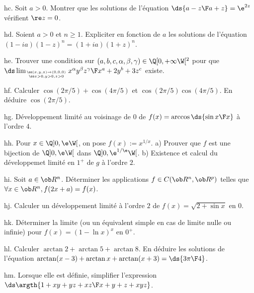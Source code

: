 \exo [Level=1,Fight=1,Learn=1,Type=\Exercices,Field=\NombresComplexes,Origin=] hc. 
Soit $a>0$. Montrer que les solutions de l'équation $\ds{a-z\F a+z}=\e^{2z}$ vérifient $\re z=0$.  

\exo [Level=1,Fight=1,Learn=1,Type=\Exercices,Field=\NombresComplexes,Origin=] hd. 
Soient $a>0$ et $n\ge1$. Expliciter en fonction de $a$ les solutions de l'équation $(1-ia)(1-z)^n=(1+ia)(1+z)^n$. 

\exo [Level=2,Fight=2,Learn=1,Type=\Exercices,Field=\Continuité,Origin=] he. 
Trouver une condition sur $(a,b,c,\alpha,\beta,\gamma)\in\Q[0,+\infty\W[^2$ pour 
que $\ds\lim_{\ss(x,y,z)\to(0,0,0)\atop\ss x>0,y>0,z>0}{x^\alpha y^\beta z^\gamma\F x^a+2y^b+3z^c}$ existe.  

\exo [Level=1,Fight=1,Learn=1,Type=\Exercices,Field=\Trigonométrie,Origin=] hf. 
Calculer $\cos (2\pi/5)+\cos(4\pi/5)$ et $\cos(2\pi/5)\cos(4\pi/5)$. 
En déduire $\cos(2\pi/5)$. 

\exo [Level=2,Fight=2,Learn=1,Type=\Exercices,Field=\DéveloppementsLimités,Origin=] hg. 
Développement limité au voisinage de $0$ de $f(x)=\arccos\ds{\sin x\F x}$ 
à l'ordre $4$. 

\exo [Level=1,Fight=2,Learn=1,Type=\Exercices,Field=\DéveloppementsLimités,Origin=] hh. 
Pour $x\in\Q]0,\e\W[$, on pose $f(x):=x^{1/x}$. \pn 
a) Prouver que $f$ est une bijection de $\Q]0,\e\W[$ dans $\Q]0,\e^{1/\e}\W[$. \pn
b) Existence et calcul du développemet limité en $1^+$ de $g$ à l'ordre $2$. 

\exo [Level=2,Fight=2,Learn=1,Type=\Exercices,Field=\Continuité,Origin=] hi. 
Soit $a\in\ob R^n$. Déterminer les applications $f\in\sc C(\ob R^n,\ob R^p)$ 
telles que $\forall x\in\ob R^n, f(2x+a)=f(x)$. 

\exo [Level=1,Fight=0,Learn=0,Type=\Exercices,Field=\DéveloppementsLimités,Origin=] hj. 
Calculer un développement limité à l'ordre $2$ de $f(x)=\sqrt{2+\sin x}$ en $0$. 

\exo [Level=1,Fight=0,Learn=0,Type=\Exercices,Field=\Equivalents,Origin=] hk. 
Déterminer la limite (ou un équivalent simple en cas de limite nulle ou infinie) pour $f(x)=(1-\ln x)^x$ en $0^+$. 

\exo [Level=1,Fight=1,Learn=0,Type=\Exercices,Field=\Fonctions,Origin=\CCP] hl. 
Calculer $\arctan 2+\arctan 5+\arctan 8$. \pn 
En déduire les solutions de l'équation 
$\arctan(x-3)+\arctan x+\arctan(x+3)=\ds{3\pi\F4}$. 

\exo [Level=1,Fight=1,Learn=0,Type=\Exercices,Field=\Fonctions,Origin=] hm. 
Lorsque elle est définie, simplifier l'expression $\ds\argth{1+xy+yz+xz\F x+y+z+xyz}$. 

